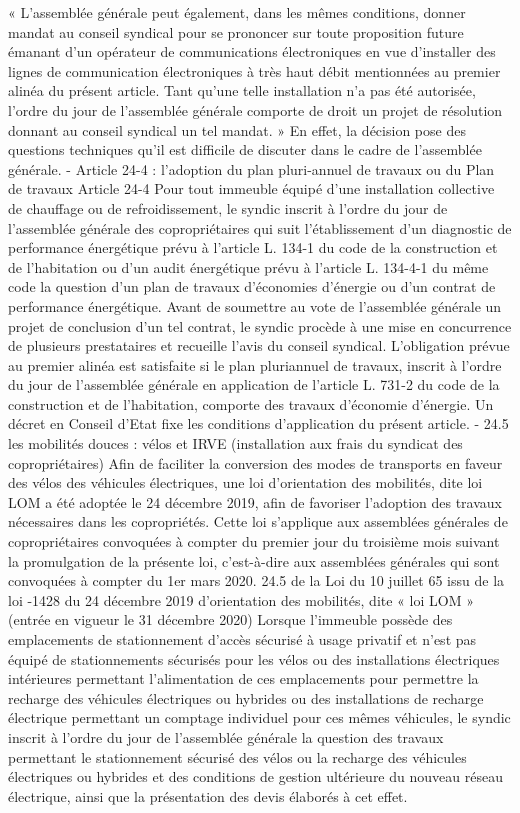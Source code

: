 				« L'assemblée générale peut également, dans les mêmes conditions, donner mandat au conseil syndical pour se prononcer sur toute proposition future émanant d'un opérateur de communications électroniques en vue d'installer des lignes de communication électroniques à très haut débit mentionnées au premier alinéa du présent article. Tant qu'une telle installation n'a pas été autorisée, l'ordre du jour de l'assemblée générale comporte de droit un projet de résolution donnant au conseil syndical un tel mandat. »
				En effet, la décision pose des questions techniques qu’il est difficile de discuter dans le cadre de l’assemblée générale.
				- Article 24-4 : l’adoption du plan pluri-annuel de travaux ou du Plan de travaux
				Article 24-4
				Pour tout immeuble équipé d'une installation collective de chauffage ou de refroidissement, le syndic inscrit à l'ordre du jour de l'assemblée générale des copropriétaires qui suit l'établissement d'un diagnostic de performance énergétique prévu à l'article L. 134-1 du code de la construction et de l'habitation ou d'un audit énergétique prévu à l'article L. 134-4-1 du même code la question d'un plan de travaux d'économies d'énergie ou d'un contrat de performance énergétique.
				Avant de soumettre au vote de l'assemblée générale un projet de conclusion d'un tel contrat, le syndic procède à une mise en concurrence de plusieurs prestataires et recueille l'avis du conseil syndical.
				L'obligation prévue au premier alinéa est satisfaite si le plan pluriannuel de travaux, inscrit à l'ordre du jour de l'assemblée générale en application de l'article L. 731-2 du code de la construction et de l'habitation, comporte des travaux d'économie d'énergie.
				Un décret en Conseil d'Etat fixe les conditions d'application du présent article.
				- 24.5 les mobilités douces : vélos et IRVE (installation aux frais du syndicat des copropriétaires)
				Afin de faciliter la conversion des modes de transports en faveur des vélos des véhicules électriques, une loi d’orientation des mobilités, dite loi LOM a été adoptée le 24 décembre 2019, afin de favoriser l’adoption des travaux nécessaires dans les copropriétés.
				Cette loi s’applique aux assemblées générales de copropriétaires convoquées à compter du premier jour du troisième mois suivant la promulgation de la présente loi, c’est-à-dire aux assemblées générales qui sont convoquées à compter du 1er mars 2020.
				24.5 de la Loi du 10 juillet 65 issu de la loi -1428 du 24 décembre 2019 d’orientation des mobilités, dite « loi LOM » (entrée en vigueur le 31 décembre 2020)
				Lorsque l'immeuble possède des emplacements de stationnement d'accès sécurisé à usage privatif et n'est pas équipé de stationnements sécurisés pour les vélos ou des installations électriques intérieures permettant l'alimentation de ces emplacements pour permettre la recharge des véhicules électriques ou hybrides ou des installations de recharge électrique permettant un comptage individuel pour ces mêmes véhicules, le syndic inscrit à l'ordre du jour de l'assemblée générale la question des travaux permettant le stationnement sécurisé des vélos ou la recharge des véhicules électriques ou hybrides et des conditions de gestion ultérieure du nouveau réseau électrique, ainsi que la présentation des devis élaborés à cet effet.
